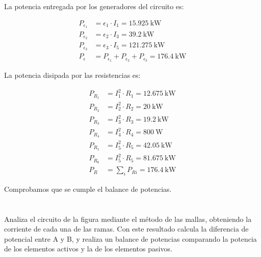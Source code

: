 \documentclass[10pt]{article}
\begin{document}
La potencia entregada por los generadores del circuito es:

\begin{align*}
  P_{\epsilon_1} &= \epsilon_1 \cdot I_1 = \SI{15.925}{\kilo\watt}\\
  P_{\epsilon_2} &= \epsilon_2 \cdot I_3 = \SI{39.2}{\kilo\watt}\\
  P_{\epsilon_3} &= \epsilon_3 \cdot I_5 = \SI{121.275}{\kilo\watt}\\
  P_\epsilon &= P_{\epsilon_1} + P_{\epsilon_2} + P_{\epsilon_3} = \SI{176.4}{\kilo\watt}  
\end{align*}

La potencia disipada por las resistencias es:

\begin{align*}
  P_{R_1} &= I_1^2 \cdot R_1 = \SI{12.675}{\kilo\watt}\\
  P_{R_2} &= I_2^2 \cdot R_2 = \SI{20}{\kilo\watt}\\
  P_{R_3} &= I_3^2 \cdot R_3 = \SI{19.2}{\kilo\watt}\\
  P_{R_4} &= I_4^2 \cdot R_4 = \SI{800}{\watt}\\
  P_{R_5} &= I_5^2 \cdot R_5 = \SI{42.05}{\kilo\watt}\\
  P_{R_6} &= I_5^2 \cdot R_5 = \SI{81.675}{\kilo\watt}\\
  P_R &= \sum_i P_{Ri} = \SI{176.4}{\kilo\watt}  
\end{align*}

Comprobamos que se cumple el balance de potencias.

\clearpage

\section{}
Analiza el circuito de la figura mediante el método de las mallas, obteniendo la corriente de cada una de las ramas. Con este resultado calcula la diferencia de potencial entre A y B, y realiza un balance de potencias comparando la potencia de los elementos activos y la de los elementos pasivos.
\end{document}

